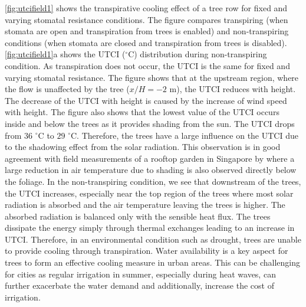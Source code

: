 \cref{fig:utcifield1} shows the transpirative cooling effect of a tree row for fixed and varying stomatal resistance conditions. The figure compares transpiring (when stomata are open and transpiration from trees is enabled) and non-transpiring conditions (when stomata are closed and transpiration from trees is disabled). \cref{fig:utcifield1}a shows the UTCI ($^{\circ}$C) distribution during non-transpiring condition. As transpiration does not occur, the UTCI is the same for fixed and varying stomatal resistance. The figure shows that at the upstream region, where the flow is unaffected by the tree ($x/H=-2$ m), the UTCI reduces with height. The decrease of the UTCI with height is caused by the increase of wind speed with height. The figure also shows that the lowest value of the UTCI occurs inside and below the trees as it provides shading from the sun. The UTCI drops from $36$ $^{\circ}$C to $29$ $^{\circ}$C. Therefore, the trees have a large influence on the UTCI due to the shadowing effect from the solar radiation. This observation is in good agreement with field measurements of a rooftop garden in Singapore by \cite{Wong2003} where a large reduction in air temperature due to shading is also observed directly below the foliage. In the non-transpiring condition, we see that downstream of the trees, the UTCI increases, especially near the top region of the trees where most solar radiation is absorbed and the air temperature leaving the trees is higher. The absorbed radiation is balanced only with the sensible heat flux. The trees dissipate the energy simply through thermal exchanges leading to an increase in UTCI. Therefore, in an environmental condition such as drought, trees are unable to provide cooling through transpiration. Water availability is a key aspect for trees to form an effective cooling measure in urban areas. This can be challenging for cities as regular irrigation in summer, especially during heat waves, can further exacerbate the water demand and additionally, increase the cost of irrigation. 

